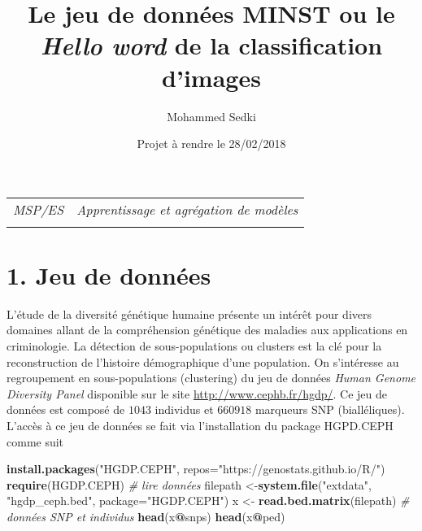 \documentclass[11pt,]{article}
\title{Le jeu de données MINST ou le \emph{Hello word} de la classification
d'images}
\author{Mohammed Sedki}
\date{Projet à rendre le 28/02/2018}
\newenvironment{Shaded}{\begin{snugshade}}{\end{snugshade}}
\newcommand{\KeywordTok}[1]{\textcolor[rgb]{0.13,0.29,0.53}{\textbf{#1}}}
\newcommand{\DataTypeTok}[1]{\textcolor[rgb]{0.13,0.29,0.53}{#1}}
\newcommand{\StringTok}[1]{\textcolor[rgb]{0.31,0.60,0.02}{#1}}
\newcommand{\CommentTok}[1]{\textcolor[rgb]{0.56,0.35,0.01}{\textit{#1}}}
\newcommand{\OperatorTok}[1]{\textcolor[rgb]{0.81,0.36,0.00}{\textbf{#1}}}
\newcommand{\NormalTok}[1]{#1}
\begin{document}
  

		\maketitle
		
	
		\thispagestyle{firststyle}



	\noindent \begin{tabular*}{\textwidth}{ @{\extracolsep{\fill}} lr @{\extracolsep{\fill}}}


\textit{MSP/ES} & \textit{Apprentissage et agrégation de modèles}\\
	&  \\
	\hline
	\end{tabular*}
	
\vspace{2mm}
	


\section{1. Jeu de données}\label{jeu-de-donnees}

L'étude de la diversité génétique humaine présente un intérêt pour
divers domaines allant de la compréhension génétique des maladies aux
applications en criminologie. La détection de sous-populations ou
clusters est la clé pour la reconstruction de l'histoire démographique
d'une population. On s'intéresse au regroupement en sous-populations
(clustering) du jeu de données \emph{Human Genome Diversity Panel}
disponible sur le site \url{http://www.cephb.fr/hgdp/}. Ce jeu de
données est composé de \(1043\) individus et \(660918\) marqueurs SNP
(bialléliques). L'accès à ce jeu de données se fait via l'installation
du package \textsf{HGPD.CEPH} comme suit

\begin{Shaded}
\begin{Highlighting}[]
\KeywordTok{install.packages}\NormalTok{(}\StringTok{"HGDP.CEPH"}\NormalTok{, }\DataTypeTok{repos=}\StringTok{"https://genostats.github.io/R/"}\NormalTok{)}
\KeywordTok{require}\NormalTok{(HGDP.CEPH)}
\CommentTok{# lire données}
\NormalTok{filepath <-}\KeywordTok{system.file}\NormalTok{(}\StringTok{"extdata"}\NormalTok{, }\StringTok{"hgdp_ceph.bed"}\NormalTok{, }\DataTypeTok{package=}\StringTok{"HGDP.CEPH"}\NormalTok{)}
\NormalTok{x <-}\StringTok{ }\KeywordTok{read.bed.matrix}\NormalTok{(filepath)}
\CommentTok{# données SNP et individus}
\KeywordTok{head}\NormalTok{(x}\OperatorTok{@}\NormalTok{snps)}
\KeywordTok{head}\NormalTok{(x}\OperatorTok{@}\NormalTok{ped)}
\end{Highlighting}
\end{Shaded}
\end{document}
